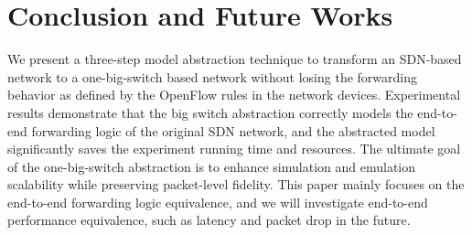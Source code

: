 \section{Conclusion and Future Works}
\label{Sec:conclusion}

We present a three-step model abstraction technique to transform an SDN-based network to a one-big-switch based network without losing the forwarding behavior as defined by the OpenFlow rules in the network devices. 
Experimental results demonstrate that the big switch abstraction correctly models the end-to-end forwarding logic of the original SDN network, and the abstracted model significantly saves the experiment running time and resources. The ultimate goal of the one-big-switch abstraction is to enhance simulation and emulation scalability while preserving packet-level fidelity. This paper mainly focuses on the end-to-end forwarding logic equivalence, and we will investigate end-to-end performance equivalence, such as latency and packet drop in the future. 



